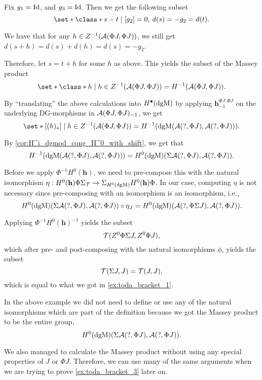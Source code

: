 \begin{example}
    Fix \( g_1 = \operatorname{Id} \), and \( g_3 = \operatorname{Id} \). Then we get the following subset
    \[
        \set*{ \class*{ s - t } \mid [g_2] = 0, \:  d(s) = - g_2 = d(t) }.
    \]

    We have that for any \( h \in Z^{-1}({\mathcal{A}}(\Phi J, \Phi J)) \), we still get \( d(s + h) = d(s) + d(h) = d(s) = - g_2 \).

    Therefore, let \( s = t + h \) for some \( h \) as above. This yields the subset of the Massey product
    \[
        \set*{ \class*{ h } \mid h \in Z^{-1}(\Ac(\Phi J, \Phi J)) } = H^{-1}(\Ac(\Phi J, \Phi J)).
    \]

    By ``translating'' the above calculations into \( H^{\bullet}(\operatorname{dgM}) \) by applying \( \mathbf{h}_{-1}^{\Phi J, \Phi J} \) on the underlying DG-morphisms in \( {\mathcal{A}}(\Phi J, \Phi J)_{-1} \), we get
    \[
        \set*{ [(h)_*] \mid h \in Z^{-1}(\Ac(\Phi J, \Phi J)) } = H^{-1}(\dgM(\Ac(?, \Phi J), \Ac(?, \Phi J))).
    \]

    By \autoref{cor:H^i_dgmod_cong_H^0_with_shift}, we get that
    \[
        H^{-1}(\operatorname{dgM}({\mathcal{A}}(?, \Phi J), {\mathcal{A}}(?, \Phi J))) = H^0(\operatorname{dgM})(\Sigma {\mathcal{A}}(?, \Phi J), {\mathcal{A}}(?, \Phi J)).
    \]

    Before we apply \( \Phi^{-1} H^0(\mathbf{h}) \), we need to pre-compose this with the natural isomorphism \( \eta: H^0(\mathbf{h}) \Phi \Sigma_{{\mathcal{T}}} \to \Sigma_{H^0(\operatorname{dgM})} H^0(\mathbf{h}) \Phi \). In our case, computing \( \eta \) is not necessary since pre-composing with an isomorphism is an isomorphism, i.e.,
    \[
        H^0(\operatorname{dgM})(\Sigma {\mathcal{A}}(?, \Phi J), {\mathcal{A}}(?, \Phi J)) \circ \eta_J = H^0(\operatorname{dgM})({\mathcal{A}}(?, \Phi \Sigma J), {\mathcal{A}}(?, \Phi J)).
    \]

    Applying \( \Phi^{-1} H^0(\mathbf{h})^{-1} \) yields the subset
    \[
        {\mathcal{T}}(Z^0 \Phi \Sigma J, Z^0 \Phi J),
    \]
    which after pre- and post-composing with the natural isomorphisms \( \phi \), yields the subset
    \[
        {\mathcal{T}}(\Sigma J, J) = {\mathcal{T}}(J, J),
    \]
    which is equal to what we got in \autoref{ex:toda_bracket_1}.
\end{example}

In the above example we did not need to define or use any of the natural isomorphisms which are part of the definition because we got the Massey product to be the entire group,
\[
    H^0(\operatorname{dgM})(\Sigma {\mathcal{A}}(?, \Phi J), {\mathcal{A}}(?, \Phi J)).
\]

We also managed to calculate the Massey product without using any special properties of \( J \) or \( \Phi J \). Therefore, we can use many of the same arguments when we are trying to prove \autoref{ex:toda_bracket_3} later on.

